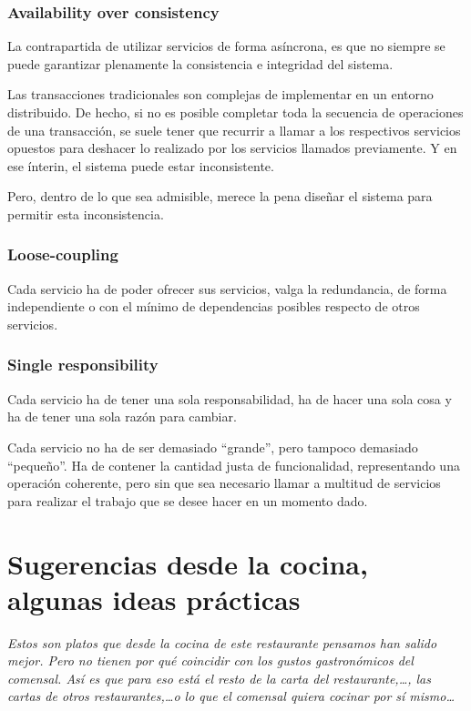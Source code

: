 \documentclass[spanish,12pt,a4paper,final,oneside]{book}
\begin{document}
\subsection{\textbf{A}vailability over consistency}

La contrapartida de utilizar servicios de forma asíncrona, es que no siempre se puede garantizar plenamente la consistencia e integridad del sistema.

Las transacciones tradicionales son complejas de implementar en un entorno distribuido. De hecho, si no es posible completar toda la secuencia de operaciones de una transacción, se suele tener que recurrir a llamar a los respectivos servicios opuestos para deshacer lo realizado por los servicios llamados previamente. Y en ese ínterin, el sistema puede estar inconsistente.

Pero, dentro de lo que sea admisible, merece la pena diseñar el sistema para permitir esta inconsistencia.

\subsection{\textbf{L}oose-coupling}

Cada servicio ha de poder ofrecer sus servicios, valga la redundancia, de forma independiente o con el mínimo de dependencias posibles respecto de otros servicios.

\subsection{\textbf{S}ingle responsibility}

Cada servicio ha de tener una sola responsabilidad, ha de hacer una sola cosa y ha de tener una sola razón para cambiar.

Cada servicio no ha de ser demasiado ``grande'', pero tampoco demasiado ``pequeño''. Ha de contener la cantidad justa de funcionalidad,  representando una operación coherente, pero sin que sea necesario llamar a multitud de servicios para realizar el trabajo que se desee hacer en un momento dado.




\chapter{Sugerencias desde la cocina, algunas ideas prácticas}
\textit{Estos son platos que desde la cocina de este restaurante pensamos han salido mejor. Pero no tienen por qué coincidir con los gustos gastronómicos del comensal. Así es que para eso está el resto de la carta del restaurante,\ldots, las cartas de otros restaurantes,\ldots o lo que el comensal quiera cocinar por sí mismo\ldots}
\end{document}

